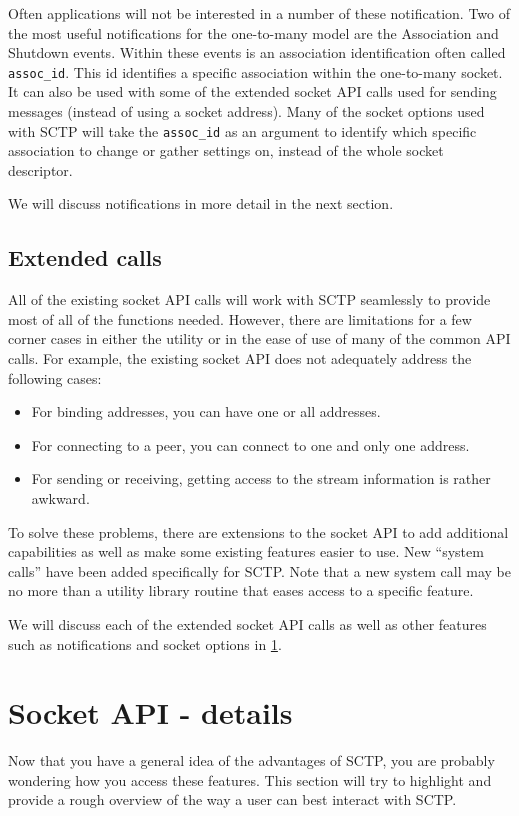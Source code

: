 \documentclass[conference]{IEEEtran}
\begin{document}
Often applications will not be interested in a number of these notification. Two of the most
useful notifications for the one-to-many model are the Association and Shutdown events. Within
these events is an association identification often called \texttt{assoc\_id}. This id identifies a specific
association within the one-to-many socket. It can also be used with some of the extended
socket API calls used for sending messages (instead of using a socket address). 
Many of the socket options used with SCTP will take the \texttt{assoc\_id} as an argument to
identify which specific association to change  or gather settings on, instead of the whole 
socket descriptor.

We will discuss notifications in more detail in the next section.

\subsection{Extended calls}

All of the existing socket API calls will work with SCTP seamlessly to
provide most of all of the functions needed. However, there are limitations for a few
corner cases in either the utility or in the ease of use of many of the common API calls.
For example, the existing socket API does not adequately address the following cases:

\begin{itemize}
 \item  For binding addresses, you can have one or all addresses.
 \item  For connecting to a peer, you can connect to one and only one address.
 \item  For sending or receiving, getting access to the stream information is rather awkward.
\end{itemize}

To solve these problems, there are extensions to the socket API to add additional capabilities
as well as make some existing features easier to use.  New ``system calls'' have been added 
specifically for SCTP. Note that a new system call may be no more than a utility library
routine that eases access to a specific feature. 

We will discuss each of the extended socket API calls as well as other features such
as notifications and socket options in \ref{adv}.


\section{Socket API - details}
\label{adv}
Now that you have a general idea of the advantages of SCTP, you are probably
wondering how you access these features. This section will try to highlight and provide
a rough overview of the way a user can best interact with SCTP.
\end{document}
